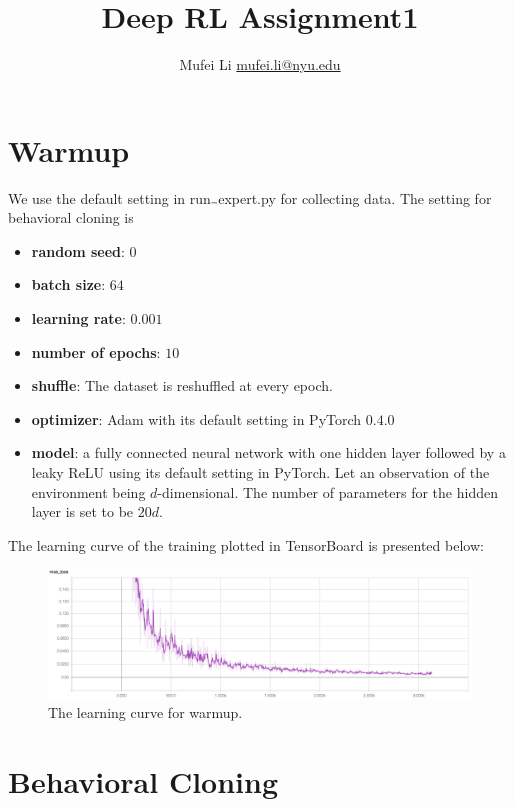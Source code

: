 \documentclass[a4paper]{article}
\title{Deep RL Assignment1}
\author{Mufei Li \href{mufei.li@nyu.edu}{mufei.li@nyu.edu}}
\theoremstyle{definition}
\begin{document}
\maketitle

\section{Warmup}

We use the default setting in run$\rule{0.15cm}{0.15mm}$expert.py for collecting data. The setting for behavioral cloning is 
\begin{itemize}
\item \textbf{random seed}: $0$
\item \textbf{batch size}: $64$
\item \textbf{learning rate}: $0.001$
\item \textbf{number of epochs}: $10$
\item \textbf{shuffle}: The dataset is reshuffled at every epoch.
\item \textbf{optimizer}: Adam with its default setting in PyTorch $0.4.0$
\item \textbf{model}: a fully connected neural network with one hidden layer followed by a leaky ReLU using its default setting in PyTorch. Let an observation of the environment being $d$-dimensional. The number of parameters for the hidden layer is set to be $20d$.
\end{itemize}

The learning curve of the training plotted in TensorBoard is presented below:

\begin{figure}[H]
\includegraphics[width=\textwidth]{warm_up.png}
\caption{The learning curve for warmup.}
\end{figure}

\section{Behavioral Cloning}

\subsection{}
\end{document}
